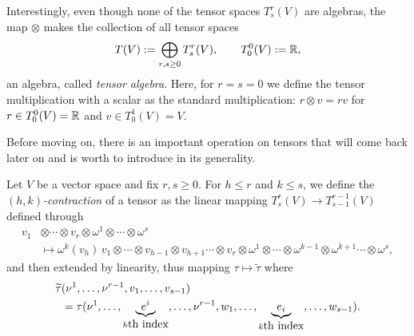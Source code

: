 \begin{remark}\label{rem:gradedtensoralgebra}
  Interestingly, even though none of the tensor spaces $T_s^r(V)$ are algebras, the map $\otimes$ makes the collection of all tensor spaces
  \begin{equation}
    T(V) := \bigoplus_{r,s\geq 0} T_s^r(V), \qquad T_0^0(V):= \mathbb{R},
  \end{equation}
  an algebra, called \emph{tensor algebra}.
  Here, for $r=s=0$ we define the tensor multiplication with a scalar as the standard multiplication: $r\otimes v = r v$ for $r\in T_0^0(V)=\mathbb{R}$ and $v\in T^1_0(V)=V$.
\end{remark}

Before moving on, there is an important operation on tensors that will come back later on and is worth to introduce in its generality.

\begin{definition}
  Let $V$ be a vector space and fix $r,s\geq0$.
  For $h\leq r$ and $k\leq s$, we define the \emph{$(h,k)$-contraction} of a tensor as the linear mapping $T_s^r(V)\to T_{s-1}^{r-1}(V)$ defined through
  \begin{align}
    v_1 & \otimes\cdots\otimes v_r\otimes\omega^1\otimes\cdots\otimes\omega^s                                                                                                             \\
        & \mapsto \omega^k(v_h)\, v_1\otimes\cdots\otimes v_{h-1}\otimes v_{h+1}\cdots\otimes v_r\otimes\omega^1\otimes\cdots\otimes\omega^{k-1}\otimes\omega^{k+1}\cdots\otimes\omega^s,
  \end{align}
  and then extended by linearity, thus mapping $\tau \mapsto \widetilde\tau$ where
  \begin{align}
    \widetilde\tau & (\nu^1,\ldots,\nu^{r-1}, v_1,\ldots,v_{s-1})                                                                                                       \\
                   & = \tau(\nu^1,\ldots,\LaTeXunderbrace{e^i}_{h\mbox{th index}},\ldots,\nu^{r-1},w_1,\ldots,\LaTeXunderbrace{e_i}_{k\mbox{th index}},\ldots,w_{s-1}).
  \end{align}
\end{definition}

